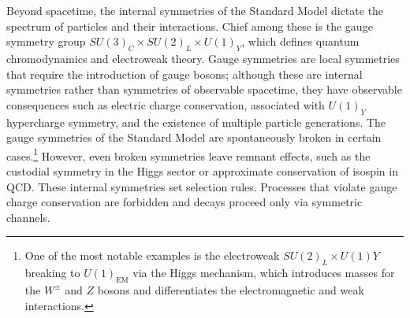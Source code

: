         Beyond spacetime, the internal symmetries of the Standard Model dictate the spectrum of particles and their interactions.
        Chief among these is the gauge symmetry group $SU(3)_C \times SU(2)_L \times U(1)_Y$, which defines quantum chromodynamics and electroweak theory.
        Gauge symmetries are local symmetries that require the introduction of gauge bosons;
        although these are internal symmetries rather than symmetries of observable spacetime, they have observable consequences such as electric charge conservation, associated with $U(1)_Y$ hypercharge symmetry, and the existence of multiple particle generations.
        The gauge symmetries of the Standard Model are spontaneously broken in certain cases.\footnote{One of the most notable examples is the electroweak $SU(2)_L \times U(1)Y$ breaking to $U(1)_{\text{EM}}$ via the Higgs mechanism, which introduces masses for the $W^\pm$ and $Z$ bosons and differentiates the electromagnetic and weak interactions.}
        However, even broken symmetries leave remnant effects, such as the custodial symmetry in the Higgs sector or approximate conservation of isospin in QCD.
        These internal symmetries set selection rules.
        Processes that violate gauge charge conservation are forbidden and decays proceed only via symmetric channels.

